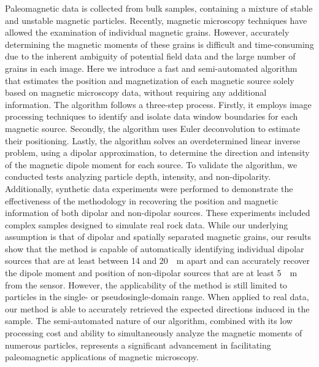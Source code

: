 Paleomagnetic data is collected from bulk samples, containing a mixture of stable and unstable magnetic particles. 
Recently, magnetic microscopy techniques have allowed the examination of individual magnetic grains. 
However, accurately determining the magnetic moments of these grains is difficult and time-consuming due to the inherent ambiguity of potential field data and the large number of grains in each image. 
Here we introduce a fast and semi-automated algorithm that estimates the position and magnetization of each magnetic source solely based on magnetic microscopy data, without requiring any additional information. 
The algorithm follows a three-step process. 
Firstly, it employs image processing techniques to identify and isolate data window boundaries for each magnetic source. 
Secondly, the algorithm uses Euler deconvolution to estimate their positioning. 
Lastly, the algorithm solves an overdetermined linear inverse problem, using a dipolar approximation, to determine the direction and intensity of the magnetic dipole moment for each source. 
To validate the algorithm, we conducted tests analyzing particle depth, intensity, and non-dipolarity. 
Additionally, synthetic data experiments were performed to demonstrate the effectiveness of the methodology in recovering the position and magnetic information of both dipolar and non-dipolar sources. 
These experiments included complex samples designed to simulate real rock data. 
While our underlying assumption is that of dipolar and spatially separated magnetic grains, our results show that the method is capable of automatically identifying individual dipolar sources that are at least between 14 and \qty{20}{\mu\meter} apart and can accurately recover the dipole moment and position of non-dipolar sources that are at least \qty{5}{\mu\meter} from the sensor.
However, the applicability of the method is still limited to particles in the single- or pseudosingle-domain range.
When applied to real data, our method is able to accurately retrieved the expected directions induced in the sample. 
The semi-automated nature of our algorithm, combined with its low processing cost and ability to simultaneously analyze the magnetic moments of numerous particles, represents a significant advancement in facilitating paleomagnetic applications of magnetic microscopy.
